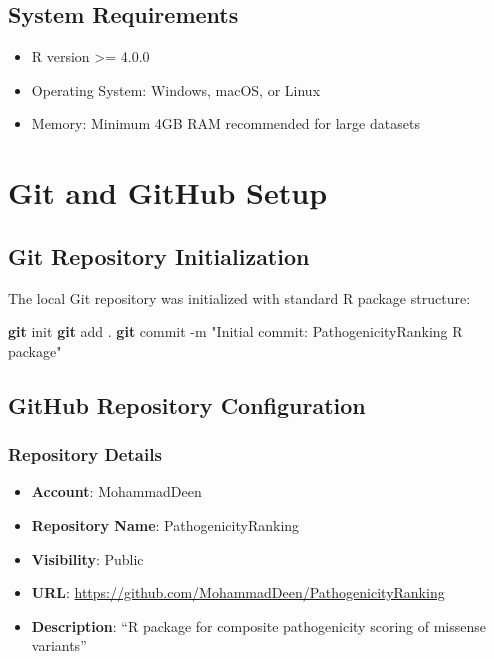 \documentclass[
  11pt,
]{article}
\newenvironment{Shaded}{\begin{snugshade}}{\end{snugshade}}
\newcommand{\AttributeTok}[1]{\textcolor[rgb]{0.13,0.29,0.53}{#1}}
\newcommand{\FunctionTok}[1]{\textcolor[rgb]{0.13,0.29,0.53}{\textbf{#1}}}
\newcommand{\NormalTok}[1]{#1}
\newcommand{\StringTok}[1]{\textcolor[rgb]{0.31,0.60,0.02}{#1}}
\providecommand{\tightlist}{%
  \setlength{\itemsep}{0pt}\setlength{\parskip}{0pt}}
\begin{document}
\subsection{System Requirements}\label{system-requirements}

\begin{itemize}
\tightlist
\item
  R version \textgreater= 4.0.0
\item
  Operating System: Windows, macOS, or Linux
\item
  Memory: Minimum 4GB RAM recommended for large datasets
\end{itemize}

\newpage

\section{Git and GitHub Setup}\label{git-and-github-setup}

\subsection{Git Repository
Initialization}\label{git-repository-initialization}

The local Git repository was initialized with standard R package
structure:

\begin{Shaded}
\begin{Highlighting}[]
\FunctionTok{git}\NormalTok{ init}
\FunctionTok{git}\NormalTok{ add .}
\FunctionTok{git}\NormalTok{ commit }\AttributeTok{{-}m} \StringTok{"Initial commit: PathogenicityRanking R package"}
\end{Highlighting}
\end{Shaded}

\subsection{GitHub Repository
Configuration}\label{github-repository-configuration}

\subsubsection{Repository Details}\label{repository-details}

\begin{itemize}
\tightlist
\item
  \textbf{Account}: MohammadDeen
\item
  \textbf{Repository Name}: PathogenicityRanking
\item
  \textbf{Visibility}: Public
\item
  \textbf{URL}:
  \url{https://github.com/MohammadDeen/PathogenicityRanking}
\item
  \textbf{Description}: ``R package for composite pathogenicity scoring
  of missense variants''
\end{itemize}
\end{document}
